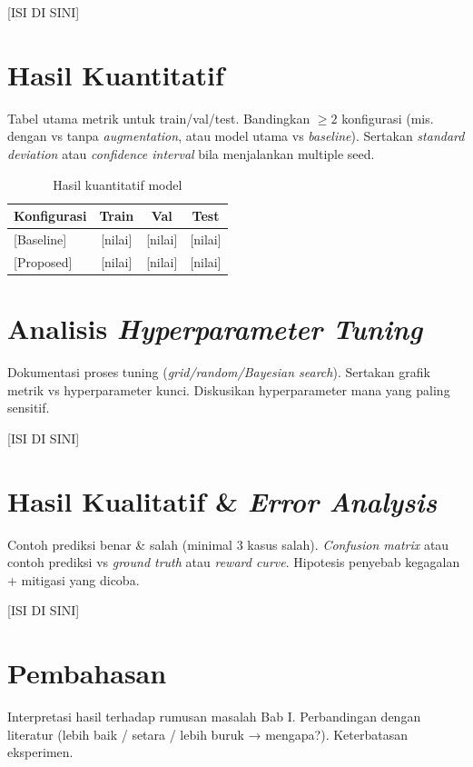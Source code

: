\documentclass[11pt,a4paper,oneside]{report}
\begin{document}
[ISI DI SINI]

\section{Hasil Kuantitatif}
\begin{petunjuk}
Tabel utama metrik untuk train/val/test. Bandingkan $\geq 2$ konfigurasi (mis. dengan vs tanpa \textit{augmentation}, atau model utama vs \textit{baseline}). Sertakan \textit{standard deviation} atau \textit{confidence interval} bila menjalankan multiple seed.
\end{petunjuk}

\begin{table}[h!]
\centering
\caption{Hasil kuantitatif model}
\label{tab:hasil}
\begin{tabular}{lccc}
\toprule
\textbf{Konfigurasi} & \textbf{Train} & \textbf{Val} & \textbf{Test} \\
\midrule
{[Baseline]}     & [nilai] & [nilai] & [nilai] \\
{[Proposed]}     & [nilai] & [nilai] & [nilai] \\
\bottomrule
\end{tabular}
\end{table}

\section{Analisis \textit{Hyperparameter Tuning}}
\begin{petunjuk}
Dokumentasi proses tuning (\textit{grid/random/Bayesian search}). Sertakan grafik metrik vs hyperparameter kunci. Diskusikan hyperparameter mana yang paling sensitif.
\end{petunjuk}

[ISI DI SINI]

\section{Hasil Kualitatif \& \textit{Error Analysis}}
\begin{petunjuk}
Contoh prediksi benar \& salah (minimal 3 kasus salah). \textit{Confusion matrix} atau contoh prediksi vs \textit{ground truth} atau \textit{reward curve}. Hipotesis penyebab kegagalan + mitigasi yang dicoba.
\end{petunjuk}

[ISI DI SINI]

\section{Pembahasan}
\begin{petunjuk}
Interpretasi hasil terhadap rumusan masalah Bab I. Perbandingan dengan literatur (lebih baik / setara / lebih buruk → mengapa?). Keterbatasan eksperimen.
\end{petunjuk}
\end{document}
